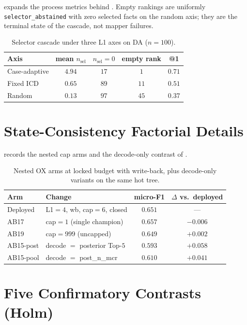  expands the process metrics behind .
Empty rankings are uniformly \texttt{selector\_abstained} with zero selected facts on the random axis; they are the terminal state of the cascade, not mapper failures.

\begin{table}[t]
\centering
\small
\caption{Selector cascade under three L1 axes on DA ($n{=}100$).}
\label{tab:org-cascade}
\begin{tabular}{lcccc}
\toprule
Axis & mean $n_{\mathrm{sel}}$ & $n_{\mathrm{sel}}{=}0$ & empty rank & @1 \\
\midrule
Case-adaptive & $4.94$ & $17$ & $1$ & $0.71$ \\
Fixed ICD & $0.65$ & $89$ & $11$ & $0.51$ \\
Random & $0.13$ & $97$ & $45$ & $0.37$ \\
\bottomrule
\end{tabular}
\end{table}

\section{State-Consistency Factorial Details}
\label{app:state-fact}

 records the nested cap arms and the decode-only contrast of .

\begin{table}[t]
\centering
\small
\caption{Nested OX arms at locked budget with write-back, plus decode-only variants on the same hot tree.}
\label{tab:state-detail}
\begin{tabular}{llcc}
\toprule
Arm & Change & micro-F1 & $\Delta$ vs.\ deployed \\
\midrule
Deployed & L1${=}4$, wb, cap${=}6$, closed & $0.651$ & --- \\
AB17 & cap${=}1$ (single champion) & $0.657$ & $-0.006$ \\
AB19 & cap${=}999$ (uncapped) & $0.649$ & $+0.002$ \\
AB15-post & decode ${=}$ posterior Top-$5$ & $0.593$ & $+0.058$ \\
AB15-pool & decode ${=}$ post\_n\_mcr & $0.610$ & $+0.041$ \\
\bottomrule
\end{tabular}
\end{table}

\section{Five Confirmatory Contrasts (Holm)}
\label{app:holm}

